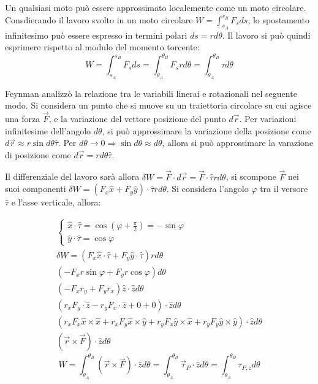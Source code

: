 \documentclass{article}
\numberwithin{equation}{subsection}
\begin{document}
Un qualsiasi moto può essere approssimato localemente come un moto circolare. Consdierando il lavoro svolto in un moto circolare $W=\displaystyle\int_{s_A}^{s_B}{F}_s ds$, lo spostamento infinitesimo può essere espresso 
in termini polari $ds=rd\theta$. Il lavoro si può quindi esprimere rispetto al modulo del momento torcente: 
\begin{equation*}
    W=\displaystyle\int_{s_A}^{s_B}{F}_s ds=\int_{\theta_A}^{\theta_B}F_srd\theta=\int_{\theta_A}^{\theta_B}\tau d\theta
\end{equation*}




Feynman analizzò la relazione tra le variabili linerai e 
rotazionali nel seguente modo. Si considera un punto che si 
muove su un traiettoria circolare su cui agisce una forza $\vec{F}$, 
e la variazione del vettore posizione del punto $d\vec{r}$. Per 
variazioni infinitesime dell'angolo $d\theta$, si può approssimare la variazione 
della posizione come $d\vec{r}\approx r\sin d\theta\hat{\tau}$. Per 
$d\theta\to 0\Rightarrow \sin d\theta\approx d\theta$, allora si può 
approssimare la varazione di posizione come $d\vec{r}=rd\theta\hat{\tau}$. 


Il differenziale del lavoro sarà allora $\delta W =\vec{F}\cdot d\vec{r}=\vec{F}\cdot\hat{\tau}rd\theta$, 
si scompone $\vec{F}$ nei suoi componenti $\delta W=(F_x\hat{x}+F_y\hat{y})\cdot\hat{\tau}rd\theta$. 
Si considera l'angolo $\varphi$ tra il versore $\hat{\tau}$ e l'asse 
verticale, allora: 

\begin{gather*}
    \begin{cases}
        \displaystyle\hat{x}\cdot\hat{\tau}=\cos\left(\varphi+\displaystyle\frac{\pi}{2}\right)=-\sin\varphi\\
        \displaystyle\hat{y}\cdot\hat{\tau}=\cos\varphi
    \end{cases}\\
    \delta W =(F_x\hat{x}\cdot\hat{\tau}+F_y\hat{y}\cdot\hat{\tau})rd\theta\\
    (-F_xr\sin\varphi+F_yr\cos\varphi)d\theta\\
    (-F_xr_y+F_yr_x)\hat{z}\cdot\hat{z}d\theta\\
    (r_xF_y\cdot\hat{z}-r_yF_x\cdot\hat{z}+0+0)\cdot\hat{z}d\theta\\
    (r_xF_x\hat{x}\times\hat{x}+r_xF_y\hat{x}\times\hat{y}+r_yF_x\hat{y}\times\hat{x}+r_yF_y\hat{y}\times\hat{y})\cdot\hat{z}d\theta\\
    (\vec{r}\times\vec{F})\cdot\hat{z}d\theta
\end{gather*}
\begin{equation}
    W=\displaystyle\int_{\theta_A}^{\theta_B}(\vec{r}\times\vec{F})\cdot\hat{z}d\theta=\int_{\theta_A}^{\theta_B}\vec{\tau}_P\cdot\hat{z}d\theta=\int_{\theta_A}^{\theta_B}{\tau}_{P,z}d\theta
\end{equation}
\end{document}

